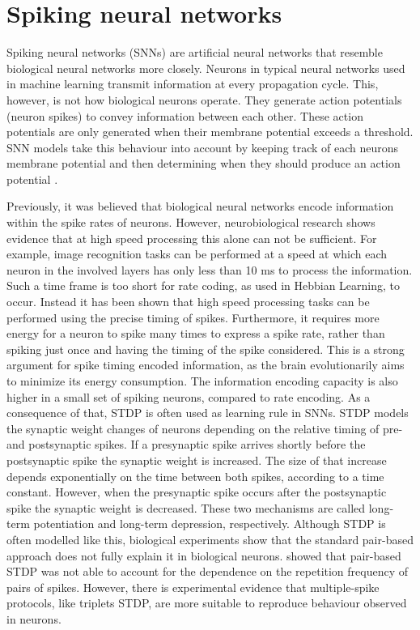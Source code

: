 \section{Spiking neural networks}
\label{sec:snn}
Spiking neural networks (SNNs) are artificial neural networks that resemble biological neural networks more closely. Neurons in typical neural networks used in machine learning transmit information at every propagation cycle. This, however, is not how biological neurons operate. They generate action potentials (neuron spikes) to convey information between each other. These action potentials are only generated when their membrane potential exceeds a threshold. SNN models take this behaviour into account by keeping track of each neurons membrane potential and then determining when they should produce an action potential  \citep{SpikingNeuronModelsBook}.

Previously, it was believed that biological neural networks encode information within the spike rates of neurons. However, neurobiological research shows evidence that at high speed processing this alone can not be sufficient. For example, image recognition tasks can be performed at a speed at which each neuron in the involved layers has only less than 10 ms to process the information. Such a time frame is too short for rate coding, as used in Hebbian Learning, to occur. Instead it has been shown that high speed processing tasks can be performed using the precise timing of spikes. Furthermore, it requires more energy for a neuron to spike many times to express a spike rate, rather than spiking just once and having the timing of the spike considered. This is a strong argument for spike timing encoded information, as the brain evolutionarily aims to minimize its energy consumption. The information encoding capacity is also higher in a small set of spiking neurons, compared to rate encoding. \citep{LearningInBiologicallyPlausibleSNN}
As a consequence of that, STDP is often used as learning rule in SNNs. STDP models the synaptic weight changes of neurons depending on the relative timing of pre- and postsynaptic spikes. If a presynaptic spike arrives shortly before the postsynaptic spike the synaptic weight is increased. The size of that increase depends exponentially on the time between both spikes, according to a time constant. However, when the presynaptic spike occurs after the postsynaptic spike the synaptic weight is decreased. These two mechanisms are called long-term potentiation and long-term depression, respectively. Although STDP is often modelled like this, biological experiments show that the standard pair-based approach does not fully explain it in biological neurons. \citep{LearningInBiologicallyPlausibleSNN} 
\citet{triplets} showed that pair-based STDP was not able to account for the dependence on the repetition frequency of pairs of spikes. However, there is experimental evidence that multiple-spike protocols, like triplets STDP, are more suitable to reproduce behaviour observed in neurons.  
